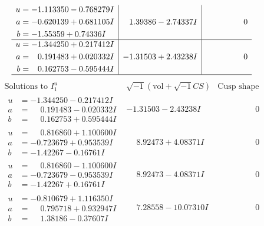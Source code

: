 \documentclass[1p]{elsarticle_modified}
\theoremstyle{definition}
\newcommand{\I}{\sqrt{-1}}
\begin{document}
$$\begin{array}{c|c|c}
\begin{aligned}
u &= -1.113350 - 0.768279 I \\
a &= -0.620139 + 0.681105 I \\
b &= -1.55359 + 0.74336 I\end{aligned}
 & \phantom{-}1.39386 - 2.74337 I & \phantom{-0.000000 } 0 \\ \hline\begin{aligned}
u &= -1.344250 + 0.217412 I \\
a &= \phantom{-}0.191483 + 0.020332 I \\
b &= \phantom{-}0.162753 - 0.595444 I\end{aligned}
 & -1.31503 + 2.43238 I & \phantom{-0.000000 } 0\\
 \hline 
 \end{array}$$\newpage$$\begin{array}{c|c|c}  
\text{Solutions to }I^u_{1}& \I (\text{vol} + \sqrt{-1}CS) & \text{Cusp shape}\\
 \hline 
\begin{aligned}
u &= -1.344250 - 0.217412 I \\
a &= \phantom{-}0.191483 - 0.020332 I \\
b &= \phantom{-}0.162753 + 0.595444 I\end{aligned}
 & -1.31503 - 2.43238 I & \phantom{-0.000000 } 0 \\ \hline\begin{aligned}
u &= \phantom{-}0.816860 + 1.100600 I \\
a &= -0.723679 + 0.953539 I \\
b &= -1.42267 - 0.16761 I\end{aligned}
 & \phantom{-}8.92473 + 4.08371 I & \phantom{-0.000000 } 0 \\ \hline\begin{aligned}
u &= \phantom{-}0.816860 - 1.100600 I \\
a &= -0.723679 - 0.953539 I \\
b &= -1.42267 + 0.16761 I\end{aligned}
 & \phantom{-}8.92473 - 4.08371 I & \phantom{-0.000000 } 0 \\ \hline\begin{aligned}
u &= -0.810679 + 1.116350 I \\
a &= \phantom{-}0.795718 + 0.932947 I \\
b &= \phantom{-}1.38186 - 0.37607 I\end{aligned}
 & \phantom{-}7.28558 - 10.07310 I & \phantom{-0.000000 } 0 \\ \hline\begin{aligned}

\end{aligned}
\end{array}$$
\end{document}
